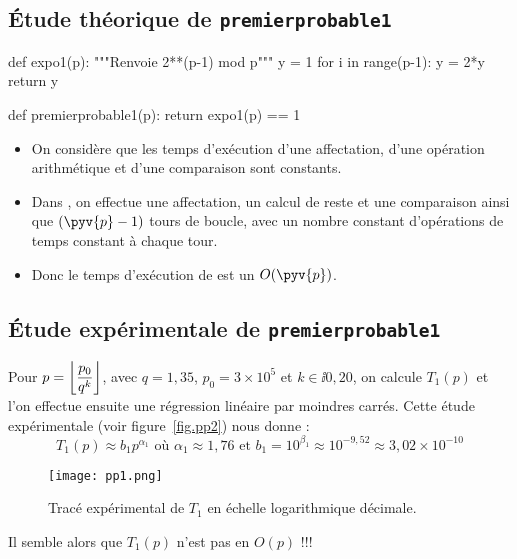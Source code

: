 \subsection{Étude théorique de \texttt{premierprobable1}}


\begin{pyverbatim}
def expo1(p):
    """Renvoie 2**(p-1) mod p"""
    y = 1
    for i in range(p-1):
        y = 2*y
    return y %

def premierprobable1(p):
    return expo1(p) == 1
\end{pyverbatim}

\begin{itemize}
\item[\textbullet] On considère que les temps d'exécution d'une affectation, d'une
  opération arithmétique et d'une comparaison sont constants.
\item[\textbullet] Dans , on effectue une affectation, un
  calcul de reste et
  une comparaison ainsi que $(\pyv{p}-1)$ tours de boucle, avec un
  nombre constant d'opérations de temps constant à chaque tour.
\item[\textbullet] Donc le temps d'exécution de  est un
  $O(\pyv{p})$.
\end{itemize}

\subsection{Étude expérimentale de \texttt{premierprobable1}}
Pour $p = \left\lfloor\dfrac{p_0}{q^k}\right\rfloor$, avec $q = 1,35$, $p_0 = 3\times 10^5$ et $k\in\ii{0,20}$, on calcule $T_1(p)$ et l'on effectue ensuite une régression linéaire par moindres carrés. Cette étude expérimentale (voir figure~\ref{fig.pp2}) nous donne :
\begin{equation*}
  T_{1}(p)\approx b_{1} p^{\alpha_{1}}
  \text{ où }\alpha_{1}\approx 1,76
  \text{ et }b_{1} = 10^{\beta_{1}} \approx 10^{-9,52}
  \approx 3,02 \times 10^{-10}
\end{equation*}
\begin{figure}[!h]
  \begin{center}
    \texttt{[image: pp1.png]}
    \caption{Tracé expérimental de $T_1$ en échelle logarithmique décimale.}
    \label{fig.pp1}
  \end{center}
\end{figure}


Il semble alors que $T_1(p)$ n'est pas en $O(p)$ !!!

